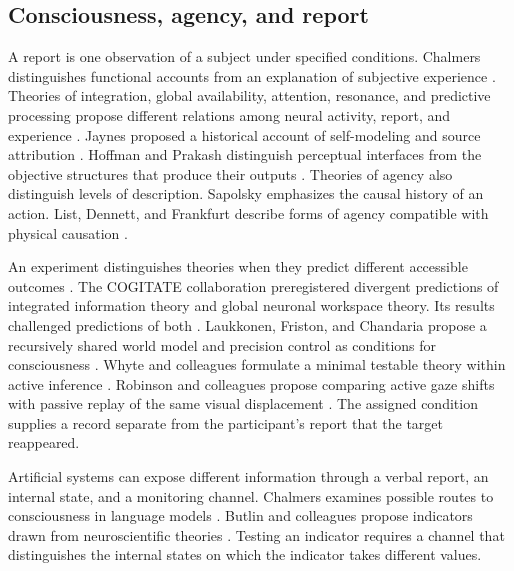 \subsection{Consciousness, agency, and report}

A report is one observation of a subject under specified conditions. Chalmers distinguishes functional accounts from an explanation of subjective experience \parencite{Chalmers1995}. Theories of integration, global availability, attention, resonance, and predictive processing propose different relations among neural activity, report, and experience \parencite{Tononi2008,Koch2019,Graziano2013,Grossberg2021,Friston2010,Parr2022}. Jaynes proposed a historical account of self-modeling and source attribution \parencite{Jaynes1976}. Hoffman and Prakash distinguish perceptual interfaces from the objective structures that produce their outputs \parencite{HoffmanPrakash2014,PrentnerHoffman2024}. Theories of agency also distinguish levels of description. Sapolsky emphasizes the causal history of an action. List, Dennett, and Frankfurt describe forms of agency compatible with physical causation \parencite{Sapolsky2023,List2019,Dennett2003,Frankfurt1971}.

An experiment distinguishes theories when they predict different accessible outcomes \parencite{GomezMarinSeth2025,TononiEtAl2025}. The COGITATE collaboration preregistered divergent predictions of integrated information theory and global neuronal workspace theory. Its results challenged predictions of both \parencite{Cogitate2025}. Laukkonen, Friston, and Chandaria propose a recursively shared world model and precision control as conditions for consciousness \parencite{Laukkonen2025}. Whyte and colleagues formulate a minimal testable theory within active inference \parencite{Whyte2026}. Robinson and colleagues propose comparing active gaze shifts with passive replay of the same visual displacement \parencite{Robinson2025}. The assigned condition supplies a record separate from the participant's report that the target reappeared.

Artificial systems can expose different information through a verbal report, an internal state, and a monitoring channel. Chalmers examines possible routes to consciousness in language models \parencite{Chalmers2023LLM}. Butlin and colleagues propose indicators drawn from neuroscientific theories \parencite{ButlinEtAl2023}. Testing an indicator requires a channel that distinguishes the internal states on which the indicator takes different values.

